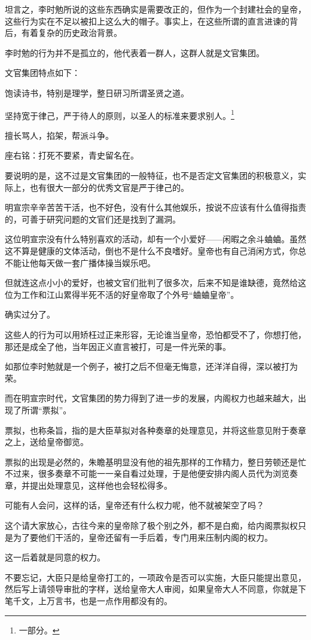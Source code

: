 \begin{multicols}{\theparacolNo}
坦言之，李时勉所说的这些东西确实是需要改正的，但作为一个封建社会的皇帝，这些行为实在不足以被扣上这么大的帽子。事实上，在这些所谓的直言进谏的背后，有着复杂的历史政治背景。

李时勉的行为并不是孤立的，他代表着一群人，这群人就是文官集团。

文官集团特点如下：

饱读诗书，特别是理学，整日研习所谓圣贤之道。

坚持宽于律己，严于待人的原则，以圣人的标准来要求别人。\footnote{一部分。}

擅长骂人，掐架，帮派斗争。

座右铭：打死不要紧，青史留名在。

要说明的是，这不过是文官集团的一般特征，也不是否定文官集团的积极意义，实际上，也有很大一部分的优秀文官是严于律己的。

明宣宗辛辛苦苦干活，也不好色，没有什么其他娱乐，按说不应该有什么值得指责的，可善于研究问题的文官们还是找到了漏洞。

这位明宣宗没有什么特别喜欢的活动，却有一个小爱好——闲暇之余斗蛐蛐。虽然这不算是健康的文体活动，倒也不是什么不良嗜好。皇帝也有自己消闲方式，你总不能让他每天做一套广播体操当娱乐吧。

但就连这点小小的爱好，也被文官们批判了很多次，后来不知是谁缺德，竟然给这位为工作和江山累得半死不活的好皇帝取了个外号“蛐蛐皇帝”。

确实过分了。

这些人的行为可以用矫枉过正来形容，无论谁当皇帝，恐怕都受不了，你想打他，那还是成全了他，当年因正义直言被打，可是一件光荣的事。

如那位李时勉就是一个例子，被打之后不但毫无悔意，还洋洋自得，深以被打为荣。

而在明宣宗时代，文官集团的势力得到了进一步的发展，内阁权力也越来越大，出现了所谓“票拟”。

票拟，也称条旨，指的是大臣草拟对各种奏章的处理意见，并将这些意见附于奏章之上，送给皇帝御览。

票拟的出现是必然的，朱瞻基明显没有他的祖先那样的工作精力，整日劳顿还是忙不过来，很多奏章不可能一一亲自看过处理，于是他便安排内阁人员代为浏览奏章，并提出处理意见，这样他也会轻松得多。

可能有人会问，这样的话，皇帝还有什么权力呢，他不就被架空了吗？

这个请大家放心，古往今来的皇帝除了极个别之外，都不是白痴，给内阁票拟权只是为了要他们干活的，皇帝还留有一手后着，专门用来压制内阁的权力。

这一后着就是同意的权力。

不要忘记，大臣只是给皇帝打工的，一项政令是否可以实施，大臣只能提出意见，然后写上请领导审批的字样，送给皇帝大人审阅，如果皇帝大人不同意，你就是下笔千文，上万言书，也是一点作用都没有的。


\end{multicols}
